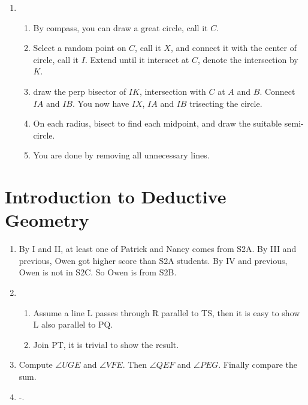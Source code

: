 \documentclass[12pt]{article}
\begin{document}
\begin{enumerate}
\begin{enumerate}
        \end{enumerate}
        \item \begin{enumerate}
            \item By compass, you can draw a great circle, call it $C$.
            \item Select a random point on $C$, call it $X$, and connect it with the center of circle, call it $I$. Extend until it intersect at $C$, denote the intersection by $K$.
            \item draw the perp bisector of $IK$, intersection with $C$ at $A$ and $B$. Connect $IA$ and $IB$. You now have $IX$, $IA$ and $IB$ trisecting the circle.
            \item On each radius, bisect to find each midpoint, and draw the suitable semi-circle.
            \item You are done by removing all unnecessary lines.
        \end{enumerate}
    \end{enumerate}

    \newpage

    \section{Introduction to Deductive Geometry}
    \begin{enumerate}
        \item By I and II, at least one of Patrick and Nancy comes from S2A. By III and previous, Owen got higher score than S2A students. By IV and previous, Owen is not in S2C. So Owen is from S2B.
        \item \begin{enumerate}
            \item Assume a line L passes through R parallel to TS, then it is easy to show L also parallel to PQ.
            \item Join PT, it is trivial to show the result.
        \end{enumerate}
        \item Compute $\angle UGE$ and $\angle VFE$. Then $\angle QEF$ and $\angle PEG$. Finally compare the sum.
        \item -.
    \end{enumerate}

    \newpage
\end{document}
